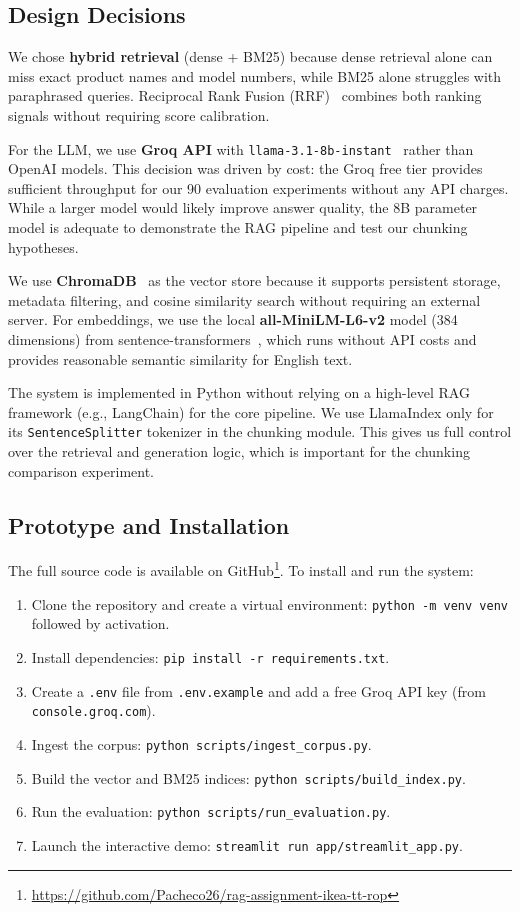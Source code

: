 \documentclass[conference]{IEEEtran}
\begin{document}
\subsection{Design Decisions}

We chose \textbf{hybrid retrieval} (dense + BM25) because dense retrieval alone can miss exact product names and model numbers, while BM25 alone struggles with paraphrased queries. Reciprocal Rank Fusion (RRF)~\cite{b3} combines both ranking signals without requiring score calibration.

For the LLM, we use \textbf{Groq API} with \texttt{llama-3.1-8b-instant}~\cite{b8} rather than OpenAI models. This decision was driven by cost: the Groq free tier provides sufficient throughput for our 90 evaluation experiments without any API charges. While a larger model would likely improve answer quality, the 8B parameter model is adequate to demonstrate the RAG pipeline and test our chunking hypotheses.

We use \textbf{ChromaDB}~\cite{b9} as the vector store because it supports persistent storage, metadata filtering, and cosine similarity search without requiring an external server. For embeddings, we use the local \textbf{all-MiniLM-L6-v2} model (384 dimensions) from sentence-transformers~\cite{b4}, which runs without API costs and provides reasonable semantic similarity for English text.

The system is implemented in Python without relying on a high-level RAG framework (e.g., LangChain) for the core pipeline. We use LlamaIndex only for its \texttt{SentenceSplitter} tokenizer in the chunking module. This gives us full control over the retrieval and generation logic, which is important for the chunking comparison experiment.

\subsection{Prototype and Installation}

The full source code is available on GitHub\footnote{\url{https://github.com/Pacheco26/rag-assignment-ikea-tt-rop}}. To install and run the system:

\begin{enumerate}
    \item Clone the repository and create a virtual environment: \texttt{python -m venv venv} followed by activation.
    \item Install dependencies: \texttt{pip install -r requirements.txt}.
    \item Create a \texttt{.env} file from \texttt{.env.example} and add a free Groq API key (from \texttt{console.groq.com}).
    \item Ingest the corpus: \texttt{python scripts/ingest\_corpus.py}.
    \item Build the vector and BM25 indices: \texttt{python scripts/build\_index.py}.
    \item Run the evaluation: \texttt{python scripts/run\_evaluation.py}.
    \item Launch the interactive demo: \texttt{streamlit run app/streamlit\_app.py}.
\end{enumerate}
\end{document}
